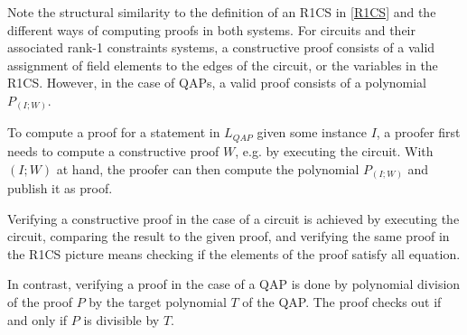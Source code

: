 Note the structural similarity to the definition of an R1CS in \ref{R1CS} and the different ways of computing proofs in both systems. For circuits and their associated rank-1 constraints systems, a constructive proof consists of a valid assignment of field elements to the edges of the circuit, or the variables in the R1CS. However,  in the case of QAPs, a valid proof consists of a polynomial $P_{(I;W)}$.

To compute a proof for a statement in $L_{QAP}$ given some instance $I$, a proofer first needs to compute a constructive proof $W$, e.g. by executing the circuit. With $(I;W)$ at hand, the proofer can then compute the polynomial $P_{(I;W)}$ and publish it as proof.

Verifying a constructive proof in the case of a circuit is achieved by executing the circuit, comparing the result to the given proof, and verifying the same proof in the R1CS picture means checking if the elements of the proof satisfy all equation. 

In contrast, verifying a proof in the case of a QAP is done by polynomial division of the proof $P$ by the target polynomial $T$ of the QAP. The proof checks out if and only if $P$ is divisible by $T$.

